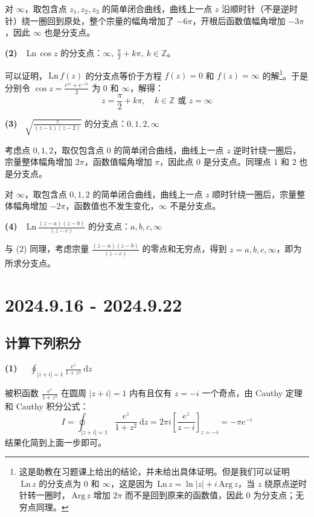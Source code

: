 \documentclass[UTF8]{report}
\def\Ln{\mathrm{\,Ln\,}}
\def\Arg{\mathrm{\,Arg\,}}
\def\Z{\mathbb{Z}}
\theoremstyle{MyLineTheoremStyle} %
\theoremstyle{MyBlockTheoremStyle} %
\theoremstyle{MySubsubsectionStyle} %
\begin{document}
对 $\infty$，取包含点 $z_1, z_2, z_3 $ 的简单闭合曲线，曲线上一点 $z$ 沿顺时针（不是逆时针）绕一圈回到原处，整个宗量的幅角增加了 $-6\pi$，开根后函数值幅角增加 $-3\pi$，因此 $\infty$ 也是分支点。

\textbf{(2)\ } $\Ln \cos z$ 的分支点：$\infty,\ \frac{\pi}{2} + k\pi,\ k \in \Z$。

可以证明，$\Ln f(z)$ 的分支点等价于方程 $f(z) = 0$ 和 $f(z) = \infty$ 的解\footnote{这是助教在习题课上给出的结论，并未给出具体证明。但是我们可以证明 $\Ln z$ 的分支点为 $0$ 和 $\infty$，这是因为 $\Ln z = \ln | z | + i\Arg z$，当 $z$ 绕原点逆时针转一圈时，$\Arg z$ 增加 $2\pi$ 而不是回到原来的函数值，因此 0 为分支点；无穷点同理。}。于是分别令 $\cos z = \frac{e^{iz} + e^{-iz}}{2}$ 为 $0$ 和 $\infty$，解得：
\begin{equation}
z = \frac{\pi}{2} + k\pi, \quad k \in \Z \text{ 或 } z = \infty
\end{equation}

\textbf{(3)\ } $\sqrt{\frac{z}{(z-1)(z-2)}} $ 的分支点：$0, 1, 2, \infty$

考虑点 $0,1,2$，取仅包含点 $0$ 的简单闭合曲线，曲线上一点 $z$ 逆时针绕一圈后，宗量整体幅角增加 $2\pi$，函数值幅角增加 $\pi$，因此点 $0$ 是分支点。同理点 $1$ 和 $2$ 也是分支点。

对 $\infty$，取包含点 $0,1,2$ 的简单闭合曲线，曲线上一点 $z$ 顺时针绕一圈后，宗量整体幅角增加 $-2\pi$，函数值也不发生变化，$\infty$ 不是分支点。

\textbf{(4)\ } $\Ln \frac{(z-a)(z-b)}{(z-c)}$ 的分支点：$a,b,c, \infty$

与 (2) 同理，考虑宗量 $\frac{(z-a)(z-b)}{(z-c)}$ 的零点和无穷点，得到 $z = a,b,c, \infty$，即为所求分支点。

\chapter{2024.9.16 - 2024.9.22}\thispagestyle{fancy}

\section{计算下列积分}

\textbf{(1)\ \ } $\displaystyle \oint_{| z + i | = 1} \frac{e^z}{1 + z^2} \ \mathrm{d} z$

被积函数 $\frac{e^z}{1 + z^2}$ 在圆周 $| z + i | = 1$ 内有且仅有 $z = -i$ 一个奇点，由 Cauthy 定理和 Cauthy 积分公式：
\begin{equation}
I =  \oint_{| z + i | = 1} \frac{e^z}{1 + z^2} \ \mathrm{d} z = 2 \pi i\left[\frac{ e^z}{z - i} \right]_{z = -i} = - \pi e^{-i}
\end{equation}
结果化简到上面一步即可。
\end{document}
